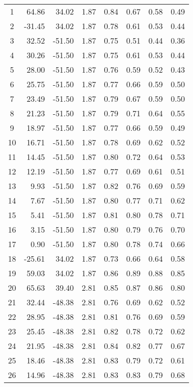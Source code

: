 \begin{center}
\begin{longtable}{crrccccc}
1 & 64.86 & 34.02 &  1.87 &  0.84 &  0.67 &  0.58 &  0.49\\
2 & -31.45 & 34.02 &  1.87 &  0.78 &  0.61 &  0.53 &  0.44\\
3 & 32.52 & -51.50 &  1.87 &  0.75 &  0.51 &  0.44 &  0.36\\
4 & 30.26 & -51.50 &  1.87 &  0.75 &  0.61 &  0.53 &  0.44\\
5 & 28.00 & -51.50 &  1.87 &  0.76 &  0.59 &  0.52 &  0.43\\
6 & 25.75 & -51.50 &  1.87 &  0.77 &  0.66 &  0.59 &  0.50\\
7 & 23.49 & -51.50 &  1.87 &  0.79 &  0.67 &  0.59 &  0.50\\
8 & 21.23 & -51.50 &  1.87 &  0.79 &  0.71 &  0.64 &  0.55\\
9 & 18.97 & -51.50 &  1.87 &  0.77 &  0.66 &  0.59 &  0.49\\
10 & 16.71 & -51.50 &  1.87 &  0.78 &  0.69 &  0.62 &  0.52\\
11 & 14.45 & -51.50 &  1.87 &  0.80 &  0.72 &  0.64 &  0.53\\
12 & 12.19 & -51.50 &  1.87 &  0.77 &  0.69 &  0.61 &  0.51\\
13 &  9.93 & -51.50 &  1.87 &  0.82 &  0.76 &  0.69 &  0.59\\
14 &  7.67 & -51.50 &  1.87 &  0.80 &  0.77 &  0.71 &  0.62\\
15 &  5.41 & -51.50 &  1.87 &  0.81 &  0.80 &  0.78 &  0.71\\
16 &  3.15 & -51.50 &  1.87 &  0.80 &  0.79 &  0.76 &  0.70\\
17 &  0.90 & -51.50 &  1.87 &  0.80 &  0.78 &  0.74 &  0.66\\
18 & -25.61 & 34.02 &  1.87 &  0.73 &  0.66 &  0.64 &  0.58\\
19 & 59.03 & 34.02 &  1.87 &  0.86 &  0.89 &  0.88 &  0.85\\
20 & 65.63 & 39.40 &  2.81 &  0.85 &  0.87 &  0.86 &  0.80\\
21 & 32.44 & -48.38 &  2.81 &  0.76 &  0.69 &  0.62 &  0.52\\
22 & 28.95 & -48.38 &  2.81 &  0.81 &  0.76 &  0.69 &  0.59\\
23 & 25.45 & -48.38 &  2.81 &  0.82 &  0.78 &  0.72 &  0.62\\
24 & 21.95 & -48.38 &  2.81 &  0.84 &  0.82 &  0.77 &  0.67\\
25 & 18.46 & -48.38 &  2.81 &  0.83 &  0.79 &  0.72 &  0.61\\
26 & 14.96 & -48.38 &  2.81 &  0.83 &  0.83 &  0.79 &  0.68\\

\end{longtable}
\end{center}
